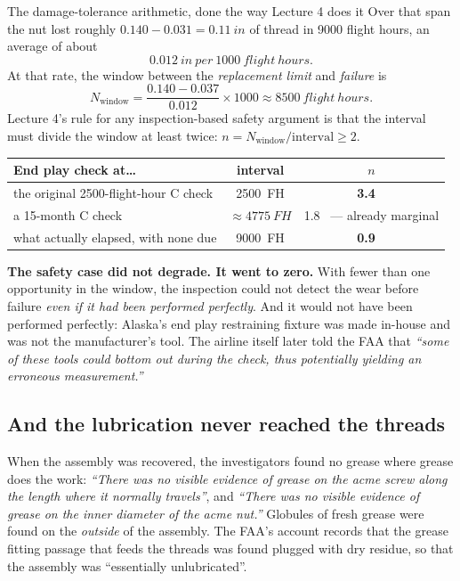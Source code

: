 \documentclass[11pt,a4paper]{article}
\newcommand{\cmark}{\textcolor{green!45!black}{\ding{51}}}
\newcommand{\xmark}{\textcolor{red!70!black}{\ding{55}}}
\begin{document}
\begin{keybox}{The damage-tolerance arithmetic, done the way Lecture 4 does it}
Over that span the nut lost roughly $0.140-0.031 = \SI{0.11}{in}$ of thread in \num{9000} flight
hours, an average of about
\[
\SI{0.012}{in\ per\ 1000\ flight\ hours}.
\]
At that rate, the window between the \emph{replacement limit} and \emph{failure} is
\[
N_{\text{window}} = \frac{0.140-0.037}{0.012}\times 1000 \approx \SI{8500}{flight\ hours}.
\]
Lecture 4's rule for any inspection-based safety argument is that the interval must divide the
window at least twice: $n = N_{\text{window}}/\text{interval} \ge 2$.

\begin{center}\small
\begin{tabular}{@{}lcc@{}}
\toprule
End play check at\dots & interval & $n$\\
\midrule
the original \num{2500}-flight-hour C check & \SI{2500}{FH} & \textbf{3.4} \ \cmark\\
a 15-month C check & $\approx\SI{4775}{FH}$ & 1.8 \ --- already marginal\\
what actually elapsed, with none due & \SI{9000}{FH} & \textbf{0.9} \ \xmark\\
\bottomrule
\end{tabular}
\end{center}

\medskip
\textbf{The safety case did not degrade. It went to zero.} With fewer than one opportunity in the
window, the inspection could not detect the wear before failure \emph{even if it had been performed
perfectly}. And it would not have been performed perfectly: Alaska's end play restraining fixture
was made in-house and was not the manufacturer's tool. The airline itself later told the FAA that
\emph{``some of these tools could bottom out during the check, thus potentially yielding an
erroneous measurement.''}
\end{keybox}

\subsection{And the lubrication never reached the threads}

When the assembly was recovered, the investigators found no grease where grease does the work:
\emph{``There was no visible evidence of grease on the acme screw along the length where it normally
travels''}, and \emph{``There was no visible evidence of grease on the inner diameter of the acme
nut.''} Globules of fresh grease were found on the \emph{outside} of the assembly. The FAA's account
records that the grease fitting passage that feeds the threads was found plugged with dry residue,
so that the assembly was ``essentially unlubricated''.
\end{document}
